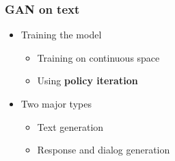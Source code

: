 \documentclass{beamer}
\begin{document}







\begin{frame}
\frametitle{GAN on text}
\begin{itemize}
\item Training the model 
  \begin{itemize}
    \item Training on continuous space
    \item Using \textbf{policy iteration}
  \end{itemize} 
\item Two major types
	\begin{itemize}
		\item Text generation
		\item Response and dialog generation

	\end{itemize}
\end{itemize}
\end{frame}
\end{document}
